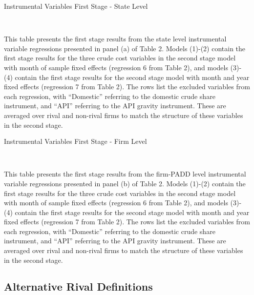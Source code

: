 \documentclass[12pt]{article}
\newcommand{\tablepath}{../output/offline/tables}
\renewcommand{\footnotesize}{\normalsize}
\begin{document}
\begin{table}[]
 \centering
    \caption{Instrumental Variables First Stage - State Level \label{tab:iv_first_st}}
  \footnotesize
   \\[1ex]
  \begin{minipage}{\linewidth}
  \scriptsize
  This table presents the first stage results from the state level instrumental variable regressions presented in panel (a) of Table 2. Models (1)-(2) contain the first stage results for the three crude cost variables in the second stage model with month of sample fixed effects (regression 6 from Table 2), and models (3)-(4) contain the first stage results for the second stage model with month and year fixed effects (regression 7 from Table 2). The rows list the excluded variables from each regression, with ``Domestic'' referring to the domestic crude share instrument, and ``API'' referring to the API gravity instrument. These are averaged over rival and non-rival firms to match the structure of these variables in the second stage.
  \end{minipage}
\end{table}

\begin{table}[]
  \centering
    \caption{Instrumental Variables First Stage - Firm Level \label{tab:iv_first_fp}}
  \footnotesize
   \\[1ex]
  \begin{minipage}{\linewidth}
  \scriptsize
  This table presents the first stage results from the firm-PADD level instrumental variable regressions presented in panel (b) of Table 2. Models (1)-(2) contain the first stage results for the three crude cost variables in the second stage model with month of sample fixed effects (regression 6 from Table 2), and models (3)-(4) contain the first stage results for the second stage model with month and year fixed effects (regression 7 from Table 2). The rows list the excluded variables from each regression, with ``Domestic'' referring to the domestic crude share instrument, and ``API'' referring to the API gravity instrument. These are averaged over rival and non-rival firms to match the structure of these variables in the second stage.
  \end{minipage}
\end{table}

\subsection{Alternative Rival Definitions  \label{App:RivalDefs}}
\end{document}
